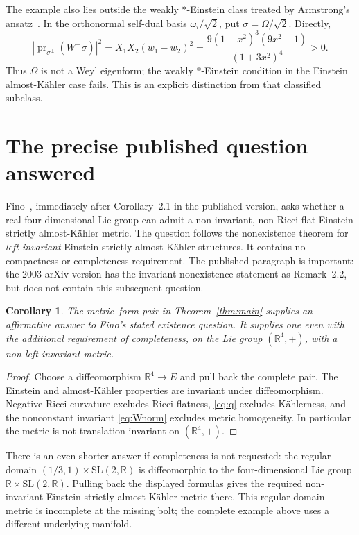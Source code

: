 \documentclass[11pt]{article}
\newtheorem{corollary}[theorem]{Corollary}
\newcommand{\R}{\mathbb R}
\begin{document}
The example also lies outside the weakly $*$-Einstein class treated
by Armstrong's ansatz~\cite{Armstrong}. In the orthonormal self-dual
basis $\omega_i/\sqrt2$, put $\sigma=\Omega/\sqrt2$. Directly,
\begin{equation}\label{eq:offdiag}
 \left|\operatorname{pr}_{\sigma^\perp}(W^+\sigma)\right|^2
 =X_1X_2(w_1-w_2)^2
 =\frac{9(1-x^2)^3(9x^2-1)}{(1+3x^2)^4}>0.
\end{equation}
Thus $\Omega$ is not a Weyl eigenform; the weakly $*$-Einstein
condition in the Einstein almost-K\"ahler case fails. This is an
explicit distinction from that classified subclass.

\section{The precise published question answered}

Fino~\cite{Fino}, immediately after Corollary~2.1 in the published
version, asks whether a real four-dimensional Lie group can admit a
non-invariant, non-Ricci-flat Einstein strictly almost-K\"ahler metric.
The question follows the nonexistence theorem for \emph{left-invariant}
Einstein strictly almost-K\"ahler structures. It contains no compactness
or completeness requirement. The published paragraph is important:
the 2003 arXiv version has the invariant nonexistence statement as
Remark~2.2, but does not contain this subsequent question.

\begin{corollary}\label{cor:Fino}
The metric--form pair in Theorem~\ref{thm:main} supplies an affirmative
answer to Fino's stated existence question. It supplies one even with
the additional requirement of completeness, on the Lie group
$(\R^4,+)$, with a non-left-invariant metric.
\end{corollary}
\begin{proof}
Choose a diffeomorphism $\R^4\to E$ and pull back the complete pair.
The Einstein and almost-K\"ahler properties are invariant under
diffeomorphism. Negative Ricci curvature excludes Ricci flatness,
\eqref{eq:q} excludes K\"ahlerness, and the nonconstant invariant
\eqref{eq:Wnorm} excludes metric homogeneity. In particular the metric
is not translation invariant on $(\R^4,+)$.
\end{proof}

There is an even shorter answer if completeness is not requested:
the regular domain $(1/3,1)\times\mathrm{SL}(2,\R)$ is diffeomorphic
to the four-dimensional Lie group $\R\times\mathrm{SL}(2,\R)$.
Pulling back the displayed formulas gives the required non-invariant
Einstein strictly almost-K\"ahler metric there. This regular-domain
metric is incomplete at the missing bolt; the complete example above
uses a different underlying manifold.
\end{document}

